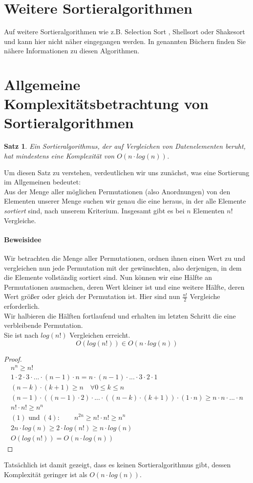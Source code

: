 \documentclass[11pt,a4paper]{scrartcl}
\newtheorem{satz}{Satz}
\begin{document}
\section{Weitere Sortieralgorithmen}
Auf weitere Sortieralgorithmen wie z.B. Selection Sort \parencite{Taschenbuch}, Shellsort oder Shakesort \parencite{Wirth} und \parencite{Grundkurs} kann hier nicht näher eingegangen werden. In genannten Büchern finden Sie nähere Informationen zu diesen Algorithmen.
\section{Allgemeine Komplexitätsbetrachtung von Sortieralgorithmen}
\begin{satz}
Ein Sortieralgorithmus, der auf Vergleichen von Datenelementen beruht, hat mindestens eine Komplexität von $O(n \cdot log(n))$.
\end{satz}
Um diesen Satz zu verstehen, verdeutlichen wir uns zunächst, was eine Sortierung im Allgemeinen bedeutet: \\
Aus der Menge aller möglichen Permutationen (also Anordnungen) von den Elementen unserer Menge suchen wir genau die eine heraus, in der alle Elemente \textit{sortiert} sind, nach unserem Kriterium. Insgesamt gibt es bei $n$ Elementen $n!$ Vergleiche. \\
\paragraph{Beweisidee}
Wir betrachten die Menge aller Permutationen, ordnen ihnen einen Wert zu und vergleichen nun jede Permutation mit der gewünschten, also derjenigen, in dem die Elemente vollständig sortiert sind. Nun können wir eine Hälfte an Permutationen ausmachen, deren Wert {\glqq}kleiner{\grqq} ist und eine weitere Hälfte, deren Wert {\glqq}größer oder gleich{\grqq} der Permutation ist. Hier sind nun $\frac{n!}{2}$ Vergleiche erforderlich. \\
Wir halbieren die Hälften fortlaufend und erhalten im letzten Schritt die eine verbleibende Permutation. \\
Sie ist nach $log(n!)$ Vergleichen erreicht.
\[O(log(n!)) \in O(n \cdot log(n))\]
\begin{proof}
\begin{align}
n^n \geq n! \\
1 \cdot 2 \cdot 3 \cdot ... \cdot (n-1) \cdot n = n \cdot (n-1) \cdot ... \cdot 3 \cdot 2 \cdot 1 \\
(n-k) \cdot (k+1) \geq n \quad \forall 0 \leq k \leq n \\
(n-1) \cdot ((n-1) \cdot 2) \cdot ... \cdot ((n-k) \cdot (k+1)) \cdot (1\cdot n) \geq n \cdot n \cdot ... \cdot n \\
n! \cdot n! \geq n^n \\
(1) \text{ und } (4): \quad \quad n^{2n} \geq n! \cdot n! \geq n^{n} \\
2n \cdot log(n) \geq 2 \cdot log(n!) \geq n \cdot log(n) \\
O(log(n!)) = O(n \cdot log(n))
\end{align}
\end{proof}
Tatsächlich ist damit gezeigt, dass es keinen Sortieralgorithmus gibt, dessen Komplexität geringer ist als $O(n \cdot log(n))$.
\pagebreak
\end{document}

